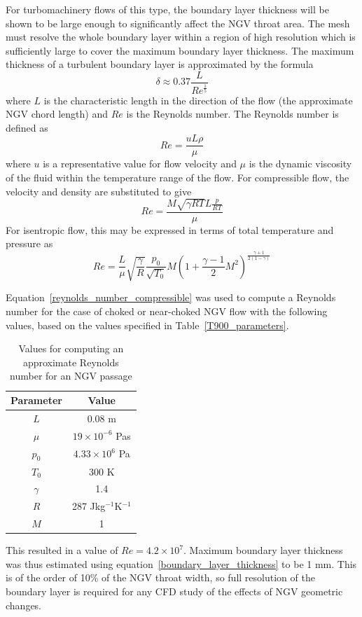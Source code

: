 \documentclass[a4paper, 11pt, oneside]{report}
\begin{document}
\newpage
For turbomachinery flows of this type, the boundary layer thickness will be shown to be large enough to significantly affect the NGV throat area. The mesh must resolve the whole boundary layer within a region of high resolution which is sufficiently large to cover the maximum boundary layer thickness. The maximum thickness of a turbulent boundary layer is approximated by the formula
\begin{equation}\label{boundary_layer_thickness}
\delta \approx
0.37
\frac{L}{Re^\frac{1}{5}}
\end{equation}
where $L$ is the characteristic length in the direction of the flow (the approximate NGV chord length) and $Re$ is the Reynolds number. The Reynolds number is defined as
\begin{equation}
Re = 
\frac{uL\rho}{\mu}
\end{equation}
where $u$ is a representative value for flow velocity and $\mu$ is the dynamic viscosity of the fluid within the temperature range of the flow. For compressible flow, the velocity and density are substituted to give
\begin{equation}
Re = 
\frac{
	M\sqrt{\gamma RT}L\frac{p}{RT}
}{
	\mu
}
\end{equation}
For isentropic flow, this may be expressed in terms of total temperature and pressure as
\begin{equation}\label{reynolds_number_compressible}
Re = 
\frac{L}{\mu}
\sqrt{\frac{\gamma}{R}}
\frac{p_0}{\sqrt{T_0}}
M
\left(
	1 +
	\frac{\gamma-1}{2}
	M^2
\right)
^{\frac{\gamma+1}{2(1-\gamma)}}
\end{equation}

Equation~\ref{reynolds_number_compressible} was used to compute a Reynolds number for the case of choked or near-choked NGV flow with the following values, based on the values specified in Table~\ref{T900_parameters}.
\begin{table}[H]
\caption{Values for computing an approximate Reynolds number for an NGV passage}
\label{reynolds_number_parameters}
\begin{center}
\begin{tabular}{|c|c|}
\hline
Parameter & Value\\
\hline
$L$ & 0.08 m\\
$\mu$ & $19 \times 10^{-6}$ Pas\\
$p_0$ & $4.33 \times 10^6$ Pa\\
$T_0$ & 300 K\\
$\gamma$ & 1.4\\
$R$ & 287 Jkg$^{-1}$K$^{-1}$\\
$M$ & 1\\
\hline
\end{tabular}
\end{center}
\end{table}
This resulted in a value of $Re = 4.2 \times 10^7$. Maximum boundary layer thickness was thus estimated using equation~\ref{boundary_layer_thickness} to be 1 mm. This is of the order of 10\% of the NGV throat width, so full resolution of the boundary layer is required for any CFD study of the effects of NGV geometric changes.
\end{document}
